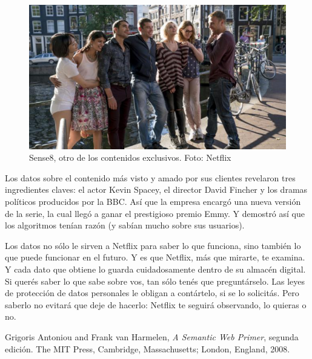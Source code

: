 \documentclass[a4paper,10pt,twoside,final,spanish]{article}
\begin{document}
\begin{figure}[!htbp]
\centerline{\includegraphics{img4}}
\caption{Sense8, otro de los contenidos exclusivos. Foto: Netflix}
\label{fig:img4}
\end{figure}
 
Los datos sobre el contenido más visto y amado por sus clientes revelaron tres ingredientes claves: el actor Kevin Spacey, el director David Fincher y los dramas políticos producidos por la BBC. Así que la empresa encargó una nueva versión de la serie, la cual llegó a ganar el prestigioso premio Emmy. Y demostró así que los algoritmos tenían razón (y sabían mucho sobre sus usuarios).

Los datos no sólo le sirven a Netflix para saber lo que funciona, sino también lo que puede funcionar en el futuro. Y es que Netflix, más que mirarte, te examina. Y cada dato que obtiene lo guarda cuidadosamente dentro de su almacén digital. Si querés saber lo que sabe sobre vos, tan sólo tenés que preguntárselo. Las leyes de protección de datos personales le obligan a contártelo, si se lo solicitás. Pero saberlo no evitará que deje de hacerlo: Netflix te seguirá observando, lo quieras o no.

\begin{thebibliography}{99}
Grigoris Antoniou and Frank van Harmelen,
\emph{A Semantic Web Primer}, segunda edición.
The MIT Press, Cambridge, Massachusetts; London, England,
2008.
\end{thebibliography}
\end{document}
